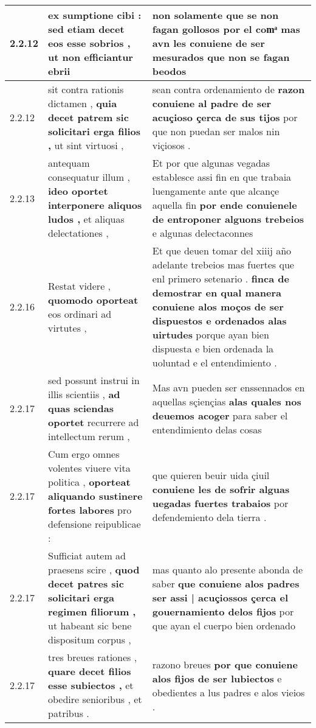 \begin{tabular}{|p{1cm}|p{6.5cm}|p{6.5cm}|}
2.2.12 & ex sumptione cibi : \textbf{ sed etiam decet eos esse sobrios , } ut non efficiantur ebrii & non solamente que se non fagan gollosos por el comͣ \textbf{ mas avn les conuiene de ser mesurados } que non se fagan beodos \\\hline
2.2.12 & sit contra rationis dictamen , \textbf{ quia decet patrem sic solicitari erga filios , } ut sint virtuosi , & sean contra ordenamiento de \textbf{ razon conuiene al padre de ser acuçioso çerca de sus tijos } por que non puedan ser malos nin viçiosos . \\\hline
2.2.13 & antequam consequatur illum , \textbf{ ideo oportet interponere aliquos ludos , } et aliquas delectationes , & Et por que algunas vegadas establesce assi fin en que trabaia luengamente ante que alcançe aquella fin \textbf{ por ende conuienele de entroponer alguons trebeios } e algunas delectaconnes \\\hline
2.2.16 & Restat videre , \textbf{ quomodo oporteat } eos ordinari ad virtutes , & Et que deuen tomar del xiiij año adelante trebeios mas fuertes que enl primero setenario . \textbf{ finca de demostrar en qual manera conuiene alos moços de ser dispuestos e ordenados alas uirtudes } porque ayan bien dispuesta e bien ordenada la uoluntad e el entendimiento . \\\hline
2.2.17 & sed possunt instrui in illis scientiis , \textbf{ ad quas sciendas oportet } recurrere ad intellectum rerum , & Mas avn pueden ser enssennados en aquellas sçiençias \textbf{ alas quales nos deuemos acoger } para saber el entendimiento delas cosas \\\hline
2.2.17 & Cum ergo omnes volentes viuere vita politica , \textbf{ oporteat aliquando sustinere fortes labores } pro defensione reipublicae : & que quieren beuir uida çiuil \textbf{ conuiene les de sofrir alguas uegadas fuertes trabaios } por defendemiento dela tierra . \\\hline
2.2.17 & Sufficiat autem ad praesens scire , \textbf{ quod decet patres sic solicitari erga regimen filiorum , } ut habeant sic bene dispositum corpus , & mas quanto alo presente abonda de saber \textbf{ que conuiene alos padres ser assi | acuçiossos çerca el gouernamiento delos fijos } por que ayan el cuerpo bien ordenado \\\hline
2.2.17 & tres breues rationes , \textbf{ quare decet filios esse subiectos , } et obedire senioribus , et patribus . & razono breues \textbf{ por que conuiene alos fijos de ser lubiectos } e obedientes a lus padres e alos vieios . \\\hline

\end{tabular}
